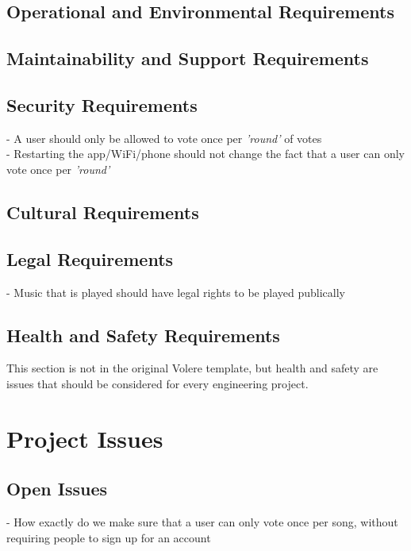 \documentclass[12pt, titlepage]{article}
\begin{document}
\subsection{Operational and Environmental Requirements}

\subsection{Maintainability and Support Requirements}

\subsection{Security Requirements}

- A user should only be allowed to vote once per \textit{'round'} of votes \\
- Restarting the app/WiFi/phone should not change the fact that a user can only
  vote once per \textit{'round'} \\

\subsection{Cultural Requirements}

\subsection{Legal Requirements}
- Music that is played should have legal rights to be played publically \\
\subsection{Health and Safety Requirements}

This section is not in the original Volere template, but health and safety are
issues that should be considered for every engineering project.

\section{Project Issues}

\subsection{Open Issues}

- How exactly do we make sure that a user can only vote once per song, without
  requiring people to sign up for an account \\
\end{document}
